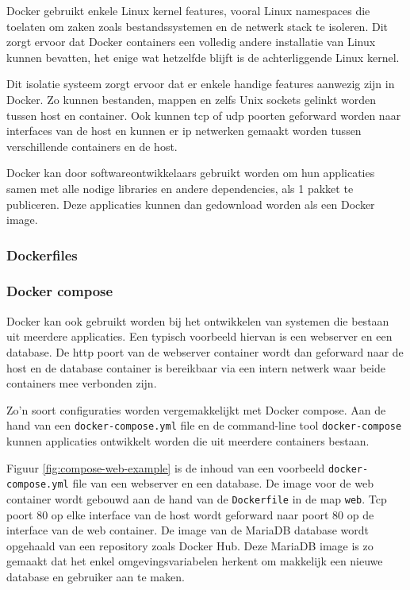 \documentclass[a4paper,12pt]{report}
\begin{document}
Docker gebruikt enkele Linux kernel features, vooral Linux namespaces die toelaten om zaken zoals bestandssystemen en de netwerk stack te isoleren.
Dit zorgt ervoor dat Docker containers een volledig andere installatie van Linux kunnen bevatten, het enige wat hetzelfde blijft is de achterliggende Linux kernel.

Dit isolatie systeem zorgt ervoor dat er enkele handige features aanwezig zijn in Docker.
Zo kunnen bestanden, mappen en zelfs Unix sockets gelinkt worden tussen host en container.
Ook kunnen tcp of udp poorten geforward worden naar interfaces van de host en kunnen er ip netwerken gemaakt worden tussen verschillende containers en de host.

Docker kan door softwareontwikkelaars gebruikt worden om hun applicaties samen met alle nodige libraries en andere dependencies, als 1 pakket te publiceren.
Deze applicaties kunnen dan gedownload worden als een Docker image.


\subsubsection{Dockerfiles}

\autocite{docker:containers}

\subsubsection{Docker compose}
Docker kan ook gebruikt worden bij het ontwikkelen van systemen die bestaan uit meerdere applicaties.
Een typisch voorbeeld hiervan is een webserver en een database.
De http poort van de webserver container wordt dan geforward naar de host en de database container is bereikbaar via een intern netwerk waar beide containers mee verbonden zijn.

Zo'n soort configuraties worden vergemakkelijkt met Docker compose.
Aan de hand van een \lstinline|docker-compose.yml| file en de command-line tool \lstinline|docker-compose| kunnen applicaties ontwikkelt worden die uit meerdere containers bestaan.
\autocite{docker:compose}

Figuur \ref{fig:compose-web-example} is de inhoud van een voorbeeld \lstinline|docker-compose.yml| file van een webserver en een database.
De image voor de web container wordt gebouwd aan de hand van de \lstinline|Dockerfile| in de map \lstinline|web|.
Tcp poort 80 op elke interface van de host wordt geforward naar poort 80 op de interface van de web container.
De image van de MariaDB database wordt opgehaald van een repository zoals Docker Hub.
Deze MariaDB image is zo gemaakt dat het enkel omgevingsvariabelen herkent om makkelijk een nieuwe database en gebruiker aan te maken.
\end{document}
